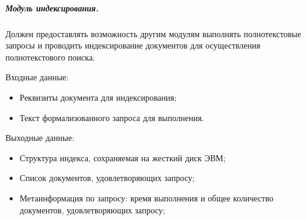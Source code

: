 \subparagraph{Модуль индексирования.}
Должен предоставлять возможность другим модулям выполнять полнотекстовые запросы и проводить индексирование документов для осуществления полнотекстового поиска.

Входные данные:
\begin{itemize}
\item Реквизиты документа для индексирования;
\item Текст формализованного запроса для выполнения.
\end{itemize}

Выходные данные:
\begin{itemize}
\item Структура индекса, сохраняемая на жесткий диск ЭВМ;
\item Список документов, удовлетворяющих запросу;
\item Метаинформация по запросу: время выполнения и общее количество документов, удовлетворяющих запросу;
\end{itemize}